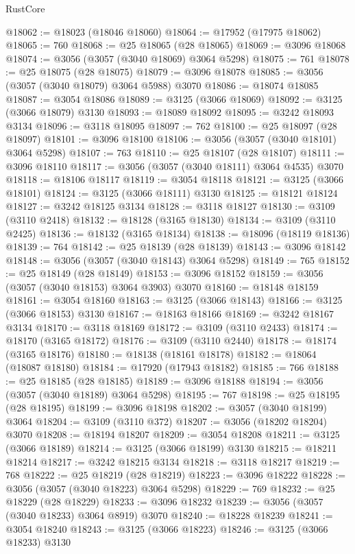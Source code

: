 \begin{lexlean}{RustCore}
\begin{coremodule}
@18062 := @18023 (@18046 @18060)
@18064 := @17952 (@17975 @18062)
@18065 := 760
@18068 := @25 @18065 (@28 @18065)
@18069 := @3096 @18068
@18074 := @3056 (@3057 (@3040 @18069) @3064 @5298)
@18075 := 761
@18078 := @25 @18075 (@28 @18075)
@18079 := @3096 @18078
@18085 := @3056 (@3057 (@3040 @18079) @3064 @5988) @3070
@18086 := @18074 @18085
@18087 := @3054 @18086
@18089 := @3125 (@3066 @18069)
@18092 := @3125 (@3066 @18079) @3130
@18093 := @18089 @18092
@18095 := @3242 @18093 @3134
@18096 := @3118 @18095
@18097 := 762
@18100 := @25 @18097 (@28 @18097)
@18101 := @3096 @18100
@18106 := @3056 (@3057 (@3040 @18101) @3064 @5298)
@18107 := 763
@18110 := @25 @18107 (@28 @18107)
@18111 := @3096 @18110
@18117 := @3056 (@3057 (@3040 @18111) @3064 @4535) @3070
@18118 := @18106 @18117
@18119 := @3054 @18118
@18121 := @3125 (@3066 @18101)
@18124 := @3125 (@3066 @18111) @3130
@18125 := @18121 @18124
@18127 := @3242 @18125 @3134
@18128 := @3118 @18127
@18130 := @3109 (@3110 @2418)
@18132 := @18128 (@3165 @18130)
@18134 := @3109 (@3110 @2425)
@18136 := @18132 (@3165 @18134)
@18138 := @18096 (@18119 @18136)
@18139 := 764
@18142 := @25 @18139 (@28 @18139)
@18143 := @3096 @18142
@18148 := @3056 (@3057 (@3040 @18143) @3064 @5298)
@18149 := 765
@18152 := @25 @18149 (@28 @18149)
@18153 := @3096 @18152
@18159 := @3056 (@3057 (@3040 @18153) @3064 @3903) @3070
@18160 := @18148 @18159
@18161 := @3054 @18160
@18163 := @3125 (@3066 @18143)
@18166 := @3125 (@3066 @18153) @3130
@18167 := @18163 @18166
@18169 := @3242 @18167 @3134
@18170 := @3118 @18169
@18172 := @3109 (@3110 @2433)
@18174 := @18170 (@3165 @18172)
@18176 := @3109 (@3110 @2440)
@18178 := @18174 (@3165 @18176)
@18180 := @18138 (@18161 @18178)
@18182 := @18064 (@18087 @18180)
@18184 := @17920 (@17943 @18182)
@18185 := 766
@18188 := @25 @18185 (@28 @18185)
@18189 := @3096 @18188
@18194 := @3056 (@3057 (@3040 @18189) @3064 @5298)
@18195 := 767
@18198 := @25 @18195 (@28 @18195)
@18199 := @3096 @18198
@18202 := @3057 (@3040 @18199) @3064
@18204 := @3109 (@3110 @372)
@18207 := @3056 (@18202 @18204) @3070
@18208 := @18194 @18207
@18209 := @3054 @18208
@18211 := @3125 (@3066 @18189)
@18214 := @3125 (@3066 @18199) @3130
@18215 := @18211 @18214
@18217 := @3242 @18215 @3134
@18218 := @3118 @18217
@18219 := 768
@18222 := @25 @18219 (@28 @18219)
@18223 := @3096 @18222
@18228 := @3056 (@3057 (@3040 @18223) @3064 @5298)
@18229 := 769
@18232 := @25 @18229 (@28 @18229)
@18233 := @3096 @18232
@18239 := @3056 (@3057 (@3040 @18233) @3064 @8919) @3070
@18240 := @18228 @18239
@18241 := @3054 @18240
@18243 := @3125 (@3066 @18223)
@18246 := @3125 (@3066 @18233) @3130

\end{coremodule}
\end{lexlean}
